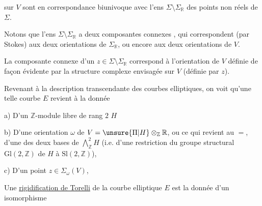 sur $V$ sont en correspondance biunivoque avec l'ens $\Sigma\setminus\Sigma_{\mathbb R}$ des points non réels de $\Sigma$.

Notons que l'ens $\Sigma\setminus\Sigma_{\mathbb R}$ a deux composantes connexes \inserted{$\Sigma_\omega^*$}, qui correspondent (par Stokes) aux deux orientations de $\Sigma_{\mathbb R}$, ou encore aux deux orientations de $V$.

La composante connexe d'un $z\in\Sigma\setminus\Sigma_{\mathbb R}$ correspond à l'orientation de $V$ définie de façon évidente par la structure complexe envisagée sur $V$ (définie par $z$).

Revenant à la description transcendante des courbes elliptiques, on voit qu'une telle courbe $E$ revient à la donnée

a) D'un $\mathbb Z$-module libre de rang $2$ $H$

b) D'une  orientation $\omega$ de $V=\unsure{\Pi|H}\otimes_{\mathbb Z}\mathbb R$, ou ce qui revient au $=$, d'une des deux bases de $\bigwedge_{\mathbb Z}^{2}H$ (i.e. d'une restriction du groupe structural $\mathrm{Gl}(2,\mathbb Z)$ de $H$ à $\mathrm{Sl}(2,\mathbb Z)$), 

c) D'un point $z\in\Sigma_\omega(V)$,

Une \uline{rigidification de Torelli} de la courbe elliptique $E$ est la donnée d'un isomorphisme
